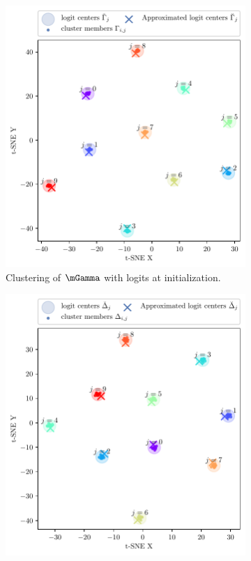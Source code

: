 \begin{figure}[h]
\begin{subfigure}[b]{0.4\textwidth}
        \includegraphics[width=\textwidth]{Appendix_Figures/TSNE_M/new/E0_gamma_ccp_cluster_pred_fc1.pdf}
        \caption{Clustering of $\mGamma$ with logits at initialization.}
        \label{fig:app_tsne_h_min}
    \end{subfigure}%
    \begin{subfigure}[b]{0.4\textwidth}
        \centering
        \captionsetup{justification=centering}
        \includegraphics[width=\textwidth]{Appendix_Figures/TSNE_M/new/E0_delta_ccp_cluster_pred_fc1.pdf}

\end{subfigure}
\end{figure}
